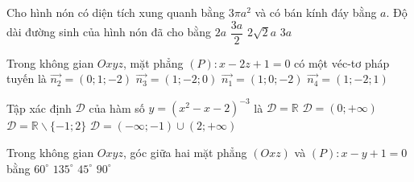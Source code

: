 \begin{ex}%
	Cho hình nón có diện tích xung quanh bằng $3 \pi a^2$ và có bán kính đáy bằng $a$. Độ dài đường sinh của hình nón đã cho bằng
	\choice
	{$2a$}
	{$\dfrac{3a}{2}$}
	{$2\sqrt{2}a$}
	{\True $3a$}
\end{ex}

\begin{ex}%
	Trong không gian $Oxyz$, mặt phẳng $(P)\colon x-2z+1=0$ có một véc-tơ pháp tuyến là
	\choice
	{$\overrightarrow{n_2}=(0;1;-2)$}
	{$\overrightarrow{n_3}=(1;-2;0)$}
	{\True $\overrightarrow{n_1}=(1;0;-2)$}
	{$\overrightarrow{n_4}=(1;-2;1)$}
\end{ex}

\begin{ex}%
	Tập xác định $\mathscr{D}$ của hàm số $y=\left(x^2-x-2\right)^{-3}$ là
	\choice
	{$\mathscr{D}=\mathbb{R}$}
	{$\mathscr{D}=(0;+\infty)$}
	{\True $\mathscr{D}=\mathbb{R}\backslash\{-1;2\}$}
	{$\mathscr{D}=(-\infty;-1) \cup(2 ;+\infty)$}
\end{ex}

\begin{ex}%
	Trong không gian $Oxyz$, góc giữa hai mặt phẳng $(Oxz)$ và $(P)\colon x-y+1=0$ bằng
	\choice
	{$60^{\circ}$}
	{$135^{\circ}$}
	{\True $45^{\circ}$}
	{$90^{\circ}$}
\end{ex}

